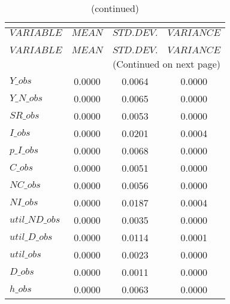  
\begin{center}
\begin{longtable}{lccc} 
\caption{THEORETICAL MOMENTS}\\
 \label{Table:th_moments}\\
\toprule 
$VARIABLE       $	 & 	 $         MEAN$	 & 	 $    STD. DEV.$	 & 	 $     VARIANCE$\\
\midrule \endfirsthead 
\caption{(continued)}\\
 \toprule \\ 
$VARIABLE       $	 & 	 $         MEAN$	 & 	 $    STD. DEV.$	 & 	 $     VARIANCE$\\
\midrule \endhead 
\midrule \multicolumn{4}{r}{(Continued on next page)} \\ \bottomrule \endfoot 
\bottomrule \endlastfoot 
$Y\_obs         $	 & 	       0.0000	 & 	       0.0064	 & 	       0.0000 \\ 
$Y\_N\_obs      $	 & 	       0.0000	 & 	       0.0065	 & 	       0.0000 \\ 
$SR\_obs        $	 & 	       0.0000	 & 	       0.0053	 & 	       0.0000 \\ 
$I\_obs         $	 & 	       0.0000	 & 	       0.0201	 & 	       0.0004 \\ 
$p\_I\_obs      $	 & 	       0.0000	 & 	       0.0068	 & 	       0.0000 \\ 
$C\_obs         $	 & 	       0.0000	 & 	       0.0051	 & 	       0.0000 \\ 
$NC\_obs        $	 & 	       0.0000	 & 	       0.0056	 & 	       0.0000 \\ 
$NI\_obs        $	 & 	       0.0000	 & 	       0.0187	 & 	       0.0004 \\ 
$util\_ND\_obs  $	 & 	       0.0000	 & 	       0.0035	 & 	       0.0000 \\ 
$util\_D\_obs   $	 & 	       0.0000	 & 	       0.0114	 & 	       0.0001 \\ 
$util\_obs      $	 & 	       0.0000	 & 	       0.0023	 & 	       0.0000 \\ 
$D\_obs         $	 & 	       0.0000	 & 	       0.0011	 & 	       0.0000 \\ 
$h\_obs         $	 & 	       0.0000	 & 	       0.0063	 & 	       0.0000 \\ 
\end{longtable}
 \end{center}
